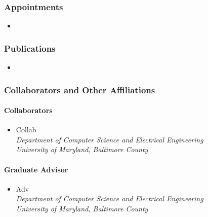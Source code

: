     \subsubsection{Appointments}
      \begin{itemize}
        \item 
      \end{itemize}

    \subsubsection{Publications}
      \begin{itemize}
	\item 
      \end{itemize}
    \subsubsection{Collaborators and Other Affiliations}
      \paragraph{Collaborators}
	\begin{itemize}
          \item Collab\\
            \textit{Department of Computer Science and Electrical Engineering
              \\University of Maryland, Baltimore County}
        \end{itemize}
      \paragraph{Graduate Advisor}
	\begin{itemize}
          \item Adv\\
            \textit{Department of Computer Science and Electrical Engineering
              \\University of Maryland, Baltimore County}
        \end{itemize}